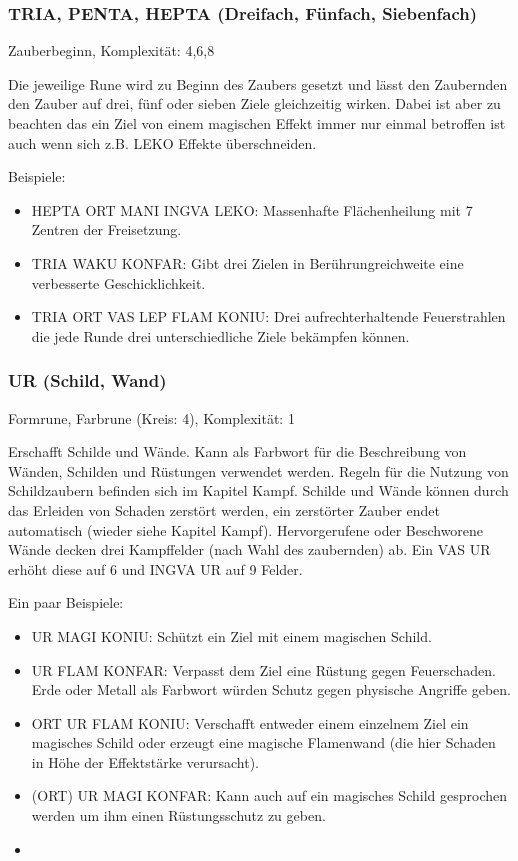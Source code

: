 \documentclass{article}
\begin{document}
\subsubsection{TRIA, PENTA, HEPTA (Dreifach, Fünfach, Siebenfach)}

Zauberbeginn, Komplexität: 4,6,8

Die jeweilige Rune wird zu Beginn des Zaubers gesetzt und lässt den Zaubernden den Zauber auf drei, fünf oder sieben
Ziele gleichzeitig wirken. Dabei ist aber zu beachten das ein Ziel von einem magischen Effekt immer nur einmal
betroffen ist auch wenn sich z.B. LEKO Effekte überschneiden.

Beispiele:

\begin{itemize}
\item HEPTA ORT MANI INGVA LEKO: Massenhafte Flächenheilung mit 7 Zentren der Freisetzung.
\item TRIA WAKU KONFAR: Gibt drei Zielen in Berührungreichweite eine verbesserte Geschicklichkeit.
\item TRIA ORT VAS LEP FLAM KONIU: Drei aufrechterhaltende Feuerstrahlen die jede Runde drei unterschiedliche Ziele bekämpfen können.
\end{itemize}

\subsubsection{UR (Schild, Wand)}

Formrune, Farbrune (Kreis: 4), Komplexität: 1

Erschafft Schilde und Wände. Kann als Farbwort für die Beschreibung von Wänden, Schilden und Rüstungen verwendet
werden. Regeln für die Nutzung von Schildzaubern befinden sich im Kapitel Kampf. Schilde und Wände können durch das
Erleiden von Schaden zerstört werden, ein zerstörter Zauber endet automatisch (wieder siehe Kapitel Kampf).
Hervorgerufene oder Beschworene Wände decken drei Kampffelder (nach Wahl des zaubernden) ab. Ein VAS UR erhöht diese
auf 6 und INGVA UR auf 9 Felder.

Ein paar Beispiele:

\begin{itemize}
\item UR MAGI KONIU: Schützt ein Ziel mit einem magischen Schild.
\item UR FLAM KONFAR: Verpasst dem Ziel eine Rüstung gegen Feuerschaden. Erde oder Metall als Farbwort würden Schutz gegen physische Angriffe geben.
\item ORT UR FLAM KONIU: Verschafft entweder einem einzelnem Ziel ein magisches Schild oder erzeugt eine magische Flamenwand (die hier Schaden in Höhe der Effektstärke verursacht).
\item (ORT) UR MAGI KONFAR: Kann auch auf ein magisches Schild gesprochen werden um ihm einen Rüstungsschutz zu geben.
\item 
\end{itemize}
\end{document}
